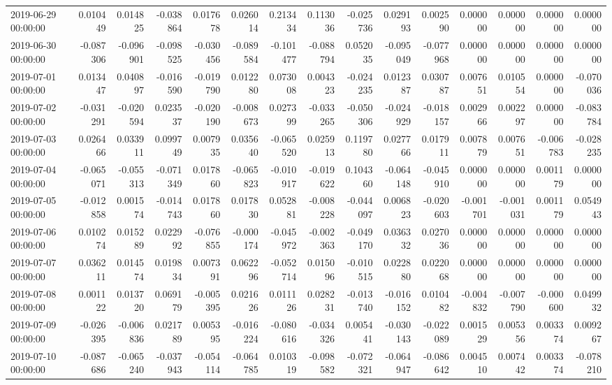 \begin{tabular}{lrrrrrrrrrrrrrr}
2019-06-29 00:00:00 & 0.010449 & 0.014825 & -0.038864 & 0.017678 & 0.026014 & 0.213434 & 0.113036 & -0.025736 & 0.029193 & 0.002590 & 0.000000 & 0.000000 & 0.000000 & 0.000000 \\
2019-06-30 00:00:00 & -0.087306 & -0.096901 & -0.098525 & -0.030456 & -0.089584 & -0.101477 & -0.088794 & 0.052035 & -0.095049 & -0.077968 & 0.000000 & 0.000000 & 0.000000 & 0.000000 \\
2019-07-01 00:00:00 & 0.013447 & 0.040897 & -0.016590 & -0.019790 & 0.012280 & 0.073008 & 0.004323 & -0.024235 & 0.012387 & 0.030787 & 0.007651 & 0.010554 & 0.000000 & -0.070036 \\
2019-07-02 00:00:00 & -0.031291 & -0.020594 & 0.023537 & -0.020190 & -0.008673 & 0.027399 & -0.033265 & -0.050306 & -0.024929 & -0.018157 & 0.002966 & 0.002297 & 0.000000 & -0.083784 \\
2019-07-03 00:00:00 & 0.026466 & 0.033911 & 0.099749 & 0.007935 & 0.035640 & -0.065520 & 0.025913 & 0.119780 & 0.027766 & 0.017911 & 0.007879 & 0.007651 & -0.006783 & -0.028235 \\
2019-07-04 00:00:00 & -0.065071 & -0.055313 & -0.071349 & 0.017860 & -0.065823 & -0.010917 & -0.019622 & 0.104360 & -0.064148 & -0.045910 & 0.000000 & 0.000000 & 0.001179 & 0.000000 \\
2019-07-05 00:00:00 & -0.012858 & 0.001574 & -0.014743 & 0.017860 & 0.017830 & 0.052881 & -0.008228 & -0.044097 & 0.006823 & -0.020603 & -0.001701 & -0.001031 & 0.001179 & 0.054943 \\
2019-07-06 00:00:00 & 0.010274 & 0.015289 & 0.022992 & -0.076855 & -0.000174 & -0.045972 & -0.002363 & -0.049170 & 0.036332 & 0.027036 & 0.000000 & 0.000000 & 0.000000 & 0.000000 \\
2019-07-07 00:00:00 & 0.036211 & 0.014574 & 0.019834 & 0.007391 & 0.062296 & -0.052714 & 0.015096 & -0.010515 & 0.022880 & 0.022068 & 0.000000 & 0.000000 & 0.000000 & 0.000000 \\
2019-07-08 00:00:00 & 0.001122 & 0.013720 & 0.069179 & -0.005395 & 0.021626 & 0.011126 & 0.028231 & -0.013740 & -0.016152 & 0.010482 & -0.004832 & -0.007790 & -0.000600 & 0.049932 \\
2019-07-09 00:00:00 & -0.026395 & -0.006836 & 0.021789 & 0.005395 & -0.016224 & -0.080616 & -0.034326 & 0.005441 & -0.030143 & -0.022089 & 0.001529 & 0.005356 & 0.003374 & 0.009267 \\
2019-07-10 00:00:00 & -0.087686 & -0.065240 & -0.037943 & -0.054114 & -0.064785 & 0.010319 & -0.098582 & -0.072321 & -0.064947 & -0.086642 & 0.004510 & 0.007442 & 0.003374 & -0.078210 \\

\end{tabular}
